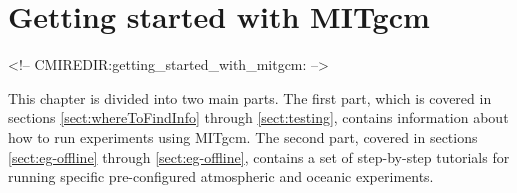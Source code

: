 
\chapter[Getting Started with MITgcm]{Getting started with MITgcm}
\label{chap:getting_started}

\begin{rawhtml}
<!-- CMIREDIR:getting_started_with_mitgcm: -->
\end{rawhtml}

This chapter is divided into two main parts. The first part, which is
covered in sections \ref{sect:whereToFindInfo} through
\ref{sect:testing}, contains information about how to run experiments
using MITgcm. The second part, covered in sections
\ref{sect:eg-offline} through \ref{sect:eg-offline}, contains a set of
step-by-step tutorials for running specific pre-configured atmospheric
and oceanic experiments.



\newpage


\newpage


\newpage


